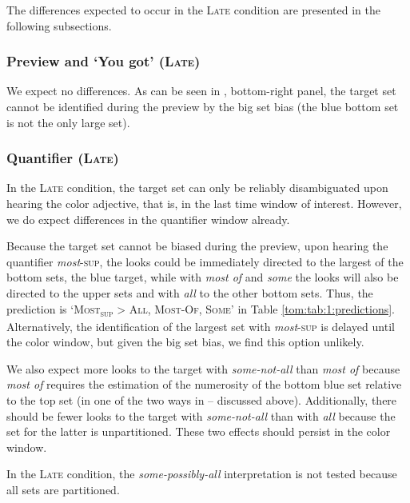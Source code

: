 \documentclass[output=paper]{langscibook}
\begin{document}

The differences expected to occur in the \textsc{Late} condition are presented in the following subsections.

\subsubsection{Preview and `You got' (\textsc{Late})}

We expect no differences. As can be seen in , bottom-right panel, the target set cannot be identified during the
preview by the big set bias (the blue bottom set is not the only large set).
\bigskip

\subsubsection{Quantifier (\textsc{Late})}

In the \textsc{Late} condition, the target set can only be reliably disambiguated upon hearing the color adjective, that is, in
the last time window of interest. However, we do expect differences in the quantifier window already.

Because the target set cannot be biased during the preview, upon hearing the quantifier \textit{most}\textsc{-sup}, the
looks could be immediately directed to the largest of the bottom sets, the blue target, while with \textit{most of} and
\textit{some} the looks will also be directed to the upper sets and with \textit{all} to the other bottom sets. Thus,
the prediction is `\textsc{Most\textsubscript{sup}} {\textgreater} \textsc{All}, \textsc{Most-Of}, \textsc{Some}' in
Table \ref{tom:tab:1:predictions}. Alternatively, the identification of the largest set with \textit{most}\textsc{-sup} is delayed until the
color window, but given the big set bias, we find this option unlikely.

We also expect more looks to the target with \textit{some-not-all} than \textit{most of} because \textit{most of}
requires the estimation of the numerosity of the bottom blue set relative to the top set (in one of the two ways in -- discussed above). Additionally, there should be fewer looks to the target with \textit{some-not-all} than with
\textit{all} because the set for the latter is unpartitioned. These two effects should persist in the color window.

In the \textsc{Late} condition, the \textit{some-possibly-all} interpretation is not tested because all sets are partitioned.
\end{document}
